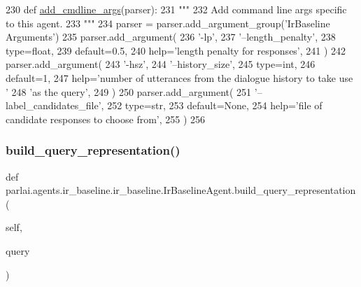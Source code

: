 \begin{DoxyCode}
230     \textcolor{keyword}{def }\hyperlink{namespaceparlai_1_1agents_1_1drqa_1_1config_a62fdd5554f1da6be0cba185271058320}{add\_cmdline\_args}(parser):
231         \textcolor{stringliteral}{"""}
232 \textcolor{stringliteral}{        Add command line args specific to this agent.}
233 \textcolor{stringliteral}{        """}
234         parser = parser.add\_argument\_group(\textcolor{stringliteral}{'IrBaseline Arguments'})
235         parser.add\_argument(
236             \textcolor{stringliteral}{'-lp'},
237             \textcolor{stringliteral}{'--length\_penalty'},
238             type=float,
239             default=0.5,
240             help=\textcolor{stringliteral}{'length penalty for responses'},
241         )
242         parser.add\_argument(
243             \textcolor{stringliteral}{'-hsz'},
244             \textcolor{stringliteral}{'--history\_size'},
245             type=int,
246             default=1,
247             help=\textcolor{stringliteral}{'number of utterances from the dialogue history to take use '}
248             \textcolor{stringliteral}{'as the query'},
249         )
250         parser.add\_argument(
251             \textcolor{stringliteral}{'--label\_candidates\_file'},
252             type=str,
253             default=\textcolor{keywordtype}{None},
254             help=\textcolor{stringliteral}{'file of candidate responses to choose from'},
255         )
256 
\end{DoxyCode}
\mbox{\label{classparlai_1_1agents_1_1ir__baseline_1_1ir__baseline_1_1IrBaselineAgent_a87f02e724544fa1531486c1f8f0e2f68}} 
\subsubsection{\texorpdfstring{build\+\_\+query\+\_\+representation()}{build\_query\_representation()}}
{\footnotesize\ttfamily def parlai.\+agents.\+ir\+\_\+baseline.\+ir\+\_\+baseline.\+Ir\+Baseline\+Agent.\+build\+\_\+query\+\_\+representation (\begin{DoxyParamCaption}\item[{}]{self,  }\item[{}]{query }\end{DoxyParamCaption})}

